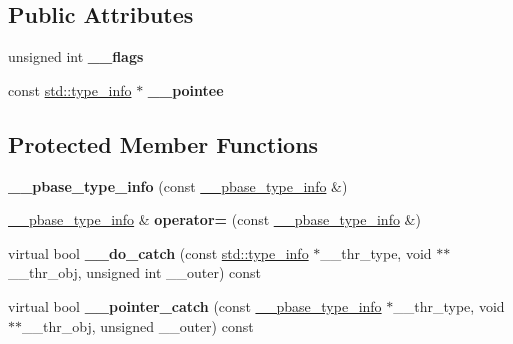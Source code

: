 \subsection*{Public Attributes}
\begin{DoxyCompactItemize}
\item 
\hypertarget{class____cxxabiv1_1_1____pbase__type__info_a7d5eadb9108ef55131a6ccf3721f266f}{unsigned int {\bfseries \+\_\+\+\_\+flags}}\label{class____cxxabiv1_1_1____pbase__type__info_a7d5eadb9108ef55131a6ccf3721f266f}

\item 
\hypertarget{class____cxxabiv1_1_1____pbase__type__info_a066a1ad314b0f38e2b0914e447529930}{const \hyperlink{classstd_1_1type__info}{std\+::type\+\_\+info} $\ast$ {\bfseries \+\_\+\+\_\+pointee}}\label{class____cxxabiv1_1_1____pbase__type__info_a066a1ad314b0f38e2b0914e447529930}

\end{DoxyCompactItemize}
\subsection*{Protected Member Functions}
\begin{DoxyCompactItemize}
\item 
\hypertarget{class____cxxabiv1_1_1____pbase__type__info_a096441b670c7d0193c7820d8e92f86e5}{{\bfseries \+\_\+\+\_\+pbase\+\_\+type\+\_\+info} (const \hyperlink{class____cxxabiv1_1_1____pbase__type__info}{\+\_\+\+\_\+pbase\+\_\+type\+\_\+info} \&)}\label{class____cxxabiv1_1_1____pbase__type__info_a096441b670c7d0193c7820d8e92f86e5}

\item 
\hypertarget{class____cxxabiv1_1_1____pbase__type__info_ae79fb21e0e8326e203ed0a428feb4114}{\hyperlink{class____cxxabiv1_1_1____pbase__type__info}{\+\_\+\+\_\+pbase\+\_\+type\+\_\+info} \& {\bfseries operator=} (const \hyperlink{class____cxxabiv1_1_1____pbase__type__info}{\+\_\+\+\_\+pbase\+\_\+type\+\_\+info} \&)}\label{class____cxxabiv1_1_1____pbase__type__info_ae79fb21e0e8326e203ed0a428feb4114}

\item 
\hypertarget{class____cxxabiv1_1_1____pbase__type__info_af22ea69aa81146a1a643160b58145562}{virtual bool {\bfseries \+\_\+\+\_\+do\+\_\+catch} (const \hyperlink{classstd_1_1type__info}{std\+::type\+\_\+info} $\ast$\+\_\+\+\_\+thr\+\_\+type, void $\ast$$\ast$\+\_\+\+\_\+thr\+\_\+obj, unsigned int \+\_\+\+\_\+outer) const }\label{class____cxxabiv1_1_1____pbase__type__info_af22ea69aa81146a1a643160b58145562}

\item 
\hypertarget{class____cxxabiv1_1_1____pbase__type__info_a916027f06191a0174d3656830d6ef8a8}{virtual bool {\bfseries \+\_\+\+\_\+pointer\+\_\+catch} (const \hyperlink{class____cxxabiv1_1_1____pbase__type__info}{\+\_\+\+\_\+pbase\+\_\+type\+\_\+info} $\ast$\+\_\+\+\_\+thr\+\_\+type, void $\ast$$\ast$\+\_\+\+\_\+thr\+\_\+obj, unsigned \+\_\+\+\_\+outer) const }\label{class____cxxabiv1_1_1____pbase__type__info_a916027f06191a0174d3656830d6ef8a8}

\end{DoxyCompactItemize}
